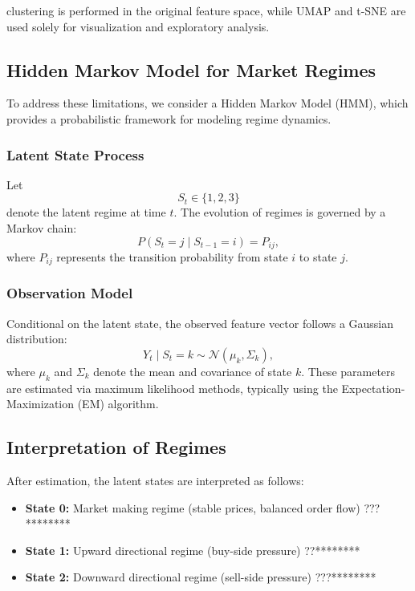 \documentclass[12pt,a4paper]{report}
\begin{document}
clustering is performed in the original feature space, while UMAP and t-SNE are used solely for visualization and exploratory analysis.


\subsection{Hidden Markov Model for Market Regimes}

To address these limitations, we consider a Hidden Markov Model (HMM), which provides a probabilistic framework for modeling regime dynamics.

\subsubsection{Latent State Process}

Let
\[
S_t \in \{1,2,3\}
\]
denote the latent regime at time $t$. The evolution of regimes is governed by a Markov chain:
\[
P(S_t = j \mid S_{t-1} = i) = P_{ij},
\]
where $P_{ij}$ represents the transition probability from state $i$ to state $j$.

\subsubsection{Observation Model}

Conditional on the latent state, the observed feature vector follows a Gaussian distribution:
\[
Y_t \mid S_t = k \sim \mathcal{N}(\mu_k, \Sigma_k),
\]
where $\mu_k$ and $\Sigma_k$ denote the mean and covariance of state $k$. These parameters are estimated via maximum likelihood methods, typically using the Expectation-Maximization (EM) algorithm.

\subsection{Interpretation of Regimes}

After estimation, the latent states are interpreted as follows:

\begin{itemize}
    \item \textbf{State 0:} Market making regime (stable prices, balanced order flow) ???********
    \item \textbf{State 1:} Upward directional regime (buy-side pressure) ??********
    \item \textbf{State 2:} Downward directional regime (sell-side pressure) ???********
\end{itemize}
\end{document}
